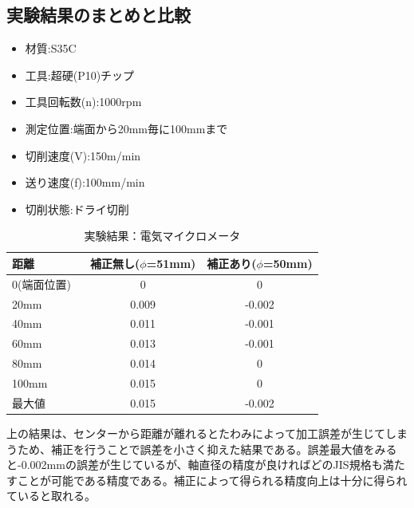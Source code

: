 \documentclass[a4j,twoside,openright,11pt]{jsarticle}
\begin{document}
\subsection{実験結果のまとめと比較}
\begin{itemize}
\item 材質:S35C
\item 工具:超硬(P10)チップ
\item 工具回転数(n):1000rpm
\item 測定位置:端面から20mm毎に100mmまで
\item 切削速度(V):150m/min
\item 送り速度(f):100mm/min
\item 切削状態:ドライ切削
\end{itemize}
\begin{table}[htb]
\begin{center}
  \caption{実験結果：電気マイクロメータ}
  \begin{tabular}{|l||c|c|} \hline
    距離　　　　&補正無し($\phi$=51mm) &補正あり($\phi$=50mm)\\
\hline
    0(端面位置) &0                   &0\\
    20mm        &0.009               &-0.002\\
    40mm        &0.011               &-0.001\\
    60mm        &0.013               &-0.001\\
    80mm        &0.014               &0\\
    100mm       &0.015               &0\\
\hline
    最大値      &0.015               &-0.002\\
\hline
  \end{tabular}
\end{center}
\end{table}

上の結果は、センターから距離が離れるとたわみによって加工誤差が生じてしまうため、補正を行うことで誤差を小さく抑えた結果である。誤差最大値をみると-0.002mmの誤差が生じているが、軸直径の精度が良ければどのJIS規格も満たすことが可能である精度である。補正によって得られる精度向上は十分に得られていると取れる。

\newpage
\end{document}
